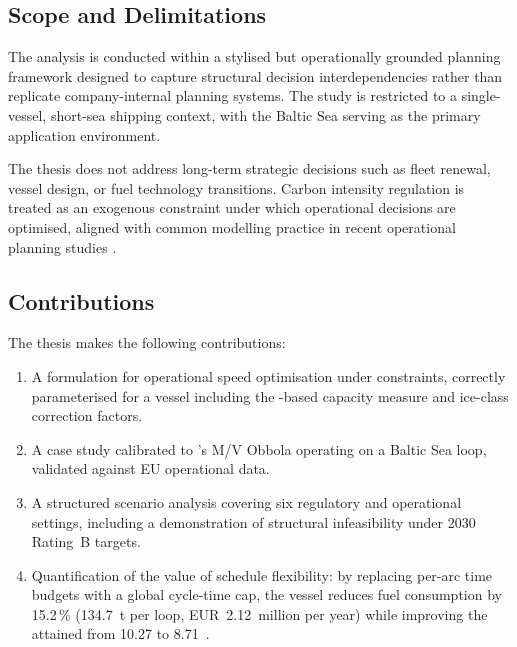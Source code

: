 \subsection{Scope and Delimitations}
\label{sec:intro:scope}

The analysis is conducted within a stylised but operationally grounded
planning framework designed to capture structural decision
interdependencies rather than replicate company-internal planning systems.
The study is restricted to a single-vessel, short-sea shipping context,
with the Baltic Sea serving as the primary application environment.

The thesis does not address long-term strategic decisions such as fleet
renewal, vessel design, or fuel technology transitions. Carbon intensity
regulation is treated as an exogenous constraint under which operational
decisions are optimised, aligned with common modelling practice in recent
operational planning studies \parencite{cheng2025cii, psaraftis2013speed}.

\subsection{Contributions}
\label{sec:intro:contributions}

The thesis makes the following contributions:

\begin{enumerate}
  \item A \MILP{} formulation for operational speed optimisation under
    \CII{} constraints, correctly parameterised for a \RoRo{} vessel
    including the \GT{}-based capacity measure and ice-class correction
    factors.
  \item A case study calibrated to \SCA{}'s M/V Obbola operating on a
    Baltic Sea loop, validated against EU \MRV{} operational data.
  \item A structured scenario analysis covering six regulatory and
    operational settings, including a demonstration of structural
    infeasibility under 2030 Rating~B targets.
  \item Quantification of the value of schedule flexibility: by replacing
    per-arc time budgets with a global cycle-time cap, the vessel reduces
    fuel consumption by 15.2\,\% (134.7~t per loop, EUR~2.12~million per year)
    while improving the attained \CII{} from 10.27 to 8.71~\gGTnm{}.
\end{enumerate}

